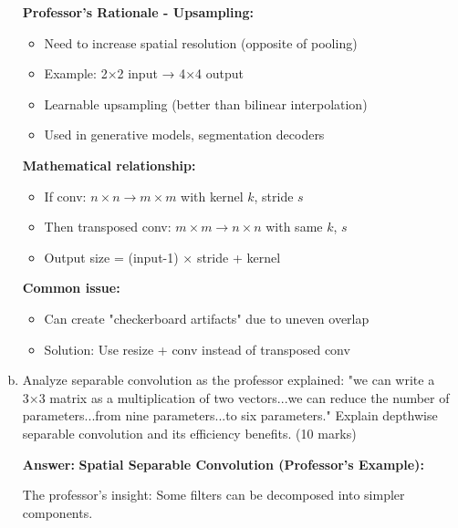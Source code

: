 \documentclass[12pt]{article}
\newcommand{\answer}[1]{{\color{answercolor}\textbf{Answer:} #1}}
\newcommand{\explanation}[1]{{\color{explanationcolor}#1}}
\begin{document}
\begin{enumerate}[(a)]
{{    \textbf{Professor's Rationale - Upsampling:}
    \begin{itemize}
        \item Need to increase spatial resolution (opposite of pooling)
        \item Example: 2×2 input → 4×4 output
        \item Learnable upsampling (better than bilinear interpolation)
        \item Used in generative models, segmentation decoders
    \end{itemize}
    
    \textbf{Mathematical relationship:}
    \begin{itemize}
        \item If conv: $n×n → m×m$ with kernel $k$, stride $s$
        \item Then transposed conv: $m×m → n×n$ with same $k$, $s$
        \item Output size = (input-1) × stride + kernel
    \end{itemize}
    
    \textbf{Common issue:}
    \begin{itemize}
        \item Can create "checkerboard artifacts" due to uneven overlap
        \item Solution: Use resize + conv instead of transposed conv
    \end{itemize}
    }
    }
    
    \item Analyze separable convolution as the professor explained: "we can write a 3×3 matrix as a multiplication of two vectors...we can reduce the number of parameters...from nine parameters...to six parameters." Explain depthwise separable convolution and its efficiency benefits. \hfill (10 marks)
    
    \answer{
    \textbf{Spatial Separable Convolution (Professor's Example):}
    
    \explanation{
    The professor's insight: Some filters can be decomposed into simpler components.
    
}}
\end{enumerate}
\end{document}
